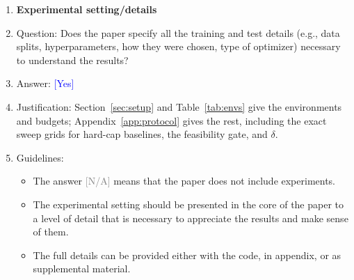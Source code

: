 \documentclass{article}
\providecommand{\answerYes}[1][]{\textcolor{blue}{[Yes] #1}}
\providecommand{\answerNA}[1][]{\textcolor{gray}{[N/A] #1}}
\begin{document}
\begin{enumerate}
\item {\bf Experimental setting/details}
    \item[] Question: Does the paper specify all the training and test details (e.g., data splits, hyperparameters, how they were chosen, type of optimizer) necessary to understand the results?
    \item[] Answer: \answerYes{}
    \item[] Justification: Section~\ref{sec:setup} and Table~\ref{tab:envs} give the environments and budgets; Appendix~\ref{app:protocol} gives the rest, including the exact sweep grids for hard-cap baselines, the feasibility gate, and $\delta$.
    \item[] Guidelines:
    \begin{itemize}
        \item The answer \answerNA{} means that the paper does not include experiments.
        \item The experimental setting should be presented in the core of the paper to a level of detail that is necessary to appreciate the results and make sense of them.
        \item The full details can be provided either with the code, in appendix, or as supplemental material.
    \end{itemize}


\end{enumerate}
\end{document}
